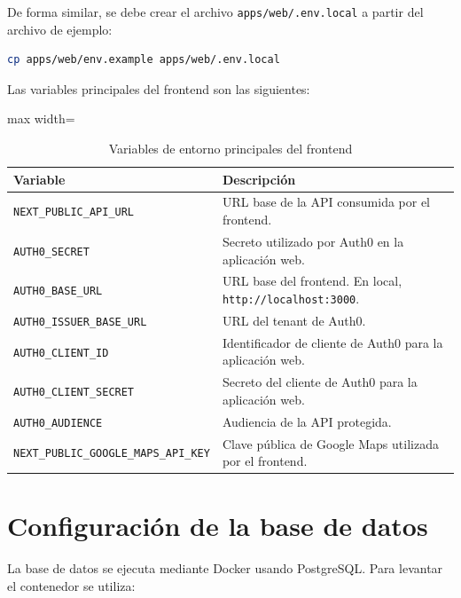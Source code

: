 De forma similar, se debe crear el archivo \texttt{apps/web/.env.local} a partir del archivo de ejemplo:

\begin{lstlisting}[language=bash, caption={Creación del archivo de entorno del frontend}, label={lst:manual_instalacion_env_web}]
cp apps/web/env.example apps/web/.env.local
\end{lstlisting}

Las variables principales del frontend son las siguientes:

\begin{table}[htbp]
\centering
\begin{adjustbox}{max width=\textwidth}
\begin{tabular}{|p{5cm}|p{7.5cm}|}
\hline
\textbf{Variable} & \textbf{Descripción} \\ \hline
\texttt{NEXT\_PUBLIC\_API\_URL} & URL base de la API consumida por el frontend. \\ \hline
\texttt{AUTH0\_SECRET} & Secreto utilizado por Auth0 en la aplicación web. \\ \hline
\texttt{AUTH0\_BASE\_URL} & URL base del frontend. En local, \texttt{http://localhost:3000}. \\ \hline
\texttt{AUTH0\_ISSUER\_BASE\_URL} & URL del tenant de Auth0. \\ \hline
\texttt{AUTH0\_CLIENT\_ID} & Identificador de cliente de Auth0 para la aplicación web. \\ \hline
\texttt{AUTH0\_CLIENT\_SECRET} & Secreto del cliente de Auth0 para la aplicación web. \\ \hline
\texttt{AUTH0\_AUDIENCE} & Audiencia de la API protegida. \\ \hline
\texttt{NEXT\_PUBLIC\_GOOGLE\_MAPS\_API\_KEY} & Clave pública de Google Maps utilizada por el frontend. \\ \hline
\end{tabular}
\end{adjustbox}
\caption{Variables de entorno principales del frontend}
\label{tab:variables_entorno_frontend}
\end{table}

\section{Configuración de la base de datos}

La base de datos se ejecuta mediante Docker usando PostgreSQL. Para levantar el contenedor se utiliza:

